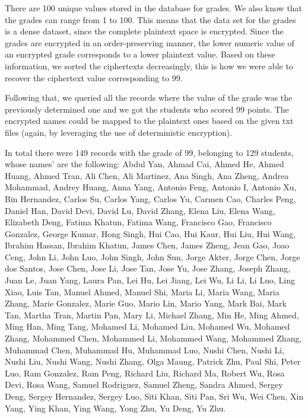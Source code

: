 There are 100 unique values stored in the database for grades. We also know that the grades can range from 1 to 100. This means that the data set for the grades is a dense dataset, since the complete plaintext space is encrypted. Since the grades are encrypted in an order-preserving manner, the lower numeric value of an encrypted grade corresponds to a lower plaintext value. Based on these information, we sorted the ciphertexts decreasingly, this is how we were able to recover the ciphertext value corresponding to 99.

Following that, we queried all the records where the value of the grade was the previously determined one and we got the students who scored 99 points. The encrypted names could be mapped to the plaintext ones based on the given txt files (again, by leveraging the use of deterministic encryption).

In total there were 149 records with the grade of 99, belonging to 129 students, whose names' are the following: Abdul Yan, Ahmad Cai, Ahmed He, Ahmed Huang, Ahmed Tran, Ali Chen, Ali Martinez, Ana Singh, Ana Zheng, Andrea Mohammad, Andrey Huang, Anna Yang, Antonio Feng, Antonio I, Antonio Xu, Bin Hernandez, Carlos Su, Carlos Yang, Carlos Yu, Carmen Cao, Charles Peng, Daniel Han, David Devi, David Lu, David Zhang, Elena Liu, Elena Wang, Elizabeth Deng, Fatima Khatun, Fatima Wang, Francisco Gao, Francisco Gonzalez, George Kumar, Hong Singh, Hui Cao, Hui Kaur, Hui Liu, Hui Wang, Ibrahim Hassan, Ibrahim Khatun, James Chen, James Zheng, Jean Gao, Joao Ceng, John Li, John Luo, John Singh, John Sun, Jorge Akter, Jorge Chen, Jorge dos Santos, Jose Chen, Jose Li, Jose Tan, Jose Yu, Jose Zhang, Joseph Zhang, Juan Le, Juan Yang, Laura Pan, Lei Hu, Lei Jiang, Lei Wu, Li Li, Li Luo, Ling Xiao, Luis Tan, Manuel Ahmed, Manuel Shi, Maria Li, Maria Wang, Maria Zhang, Marie Gonzalez, Marie Guo, Mario Lin, Mario Yang, Mark Bai, Mark Tan, Martha Tran, Martin Pan, Mary Li, Michael Zhang, Min He, Ming Ahmed, Ming Han, Ming Tang, Mohamed Li, Mohamed Liu, Mohamed Wu, Mohamed Zhang, Mohammed Chen, Mohammed Li, Mohammed Wang, Mohammed Zhang, Muhammad Chen, Muhammad Hu, Muhammad Luo, Nushi Chen, Nushi Li, Nushi Liu, Nushi Wang, Nushi Zhang, Olga Maung, Patrick Zhu, Paul Shi, Peter Luo, Ram Gonzalez, Ram Peng, Richard Liu, Richard Ma, Robert Wu, Rosa Devi, Rosa Wang, Samuel Rodriguez, Samuel Zheng, Sandra Ahmed, Sergey Deng, Sergey Hernandez, Sergey Luo, Siti Khan, Siti Pan, Sri Wu, Wei Chen, Xin Yang, Ying Khan, Ying Wang, Yong Zhu, Yu Deng, Yu Zhu.

